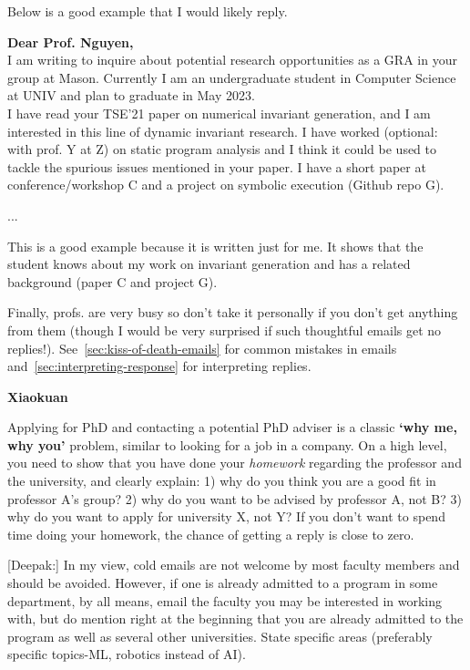 \documentclass[oneside,11pt,dvipsnames]{book}
\newenvironment{commentbox}[1][]{
  \small
  \begin{mybox}
    {\small \textbf{#1}}
  }{
  \end{mybox}
}
\begin{document}
Below is a good example that I would likely reply.

\begin{commentbox}[Dear Prof. Nguyen,]\\

  I am writing to inquire about potential research opportunities as a GRA in your group at Mason. Currently I am an undergraduate student in Computer Science at UNIV and plan to graduate in May 2023.
    \\

  I have read your TSE'21 paper on numerical invariant generation, and I am interested in this line of dynamic invariant research. I have worked (optional: with prof. Y at Z) on static program analysis and I think it could be used to tackle the spurious issues mentioned in your paper. I have a short paper at conference/workshop C and a project on symbolic execution (Github repo G).

  ...

 \tcblower
  This is a good example because it is written just for me.  It shows that the student knows about my work on invariant generation and has a related background (paper C and project G).
\end{commentbox}

Finally, profs. are very busy so don't take it personally if you don't get anything from them (though I would be very surprised if such thoughtful emails get no replies!).
See~\autoref{sec:kiss-of-death-emails} for common mistakes in emails and~\autoref{sec:interpreting-response} for interpreting replies.

\begin{commentbox}[Xiaokuan]
  Applying for PhD and contacting a potential PhD adviser is a classic \textbf{`why me, why you'} problem,
  similar to looking for a job in a company.
  On a high level,
  you need to show that you have done your \emph{homework}
  regarding the professor and the university,
  and clearly explain:
  1) why do you think you are a good fit in professor A's group?
  2) why do you want to be advised by professor A, not B?
  3) why do you want to apply for university X, not Y?
  If you don't want to spend time doing your homework,
  the chance of getting a reply is close to zero.
\end{commentbox}


\begin{commentbox}
  [Deepak:]
  In my view, cold emails are not welcome by most faculty members and should be avoided. However, if one is already admitted to a program in some department, by all means, email the faculty you may be interested in working with, but do mention right at the beginning that you are already admitted to the program as well as several other universities. State specific areas (preferably specific topics-ML, robotics instead of AI).
\end{commentbox}
\end{document}
